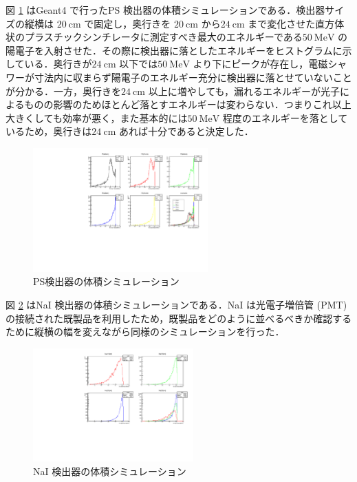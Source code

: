 図 \ref{PS_sim} はGeant4 で行ったPS 検出器の体積シミュレーションである．検出器サイズの縦横は $20~\mathrm{cm}$ で固定し，奥行きを $20~\mathrm{cm}$ から$24~\mathrm{cm}$ まで変化させた直方体状のプラスチックシンチレータに測定すべき最大のエネルギーである$50~\mathrm{MeV}$ の陽電子を入射させた．その際に検出器に落としたエネルギーをヒストグラムに示している．奥行きが$24~\mathrm{cm}$ 以下では$50~\mathrm{MeV}$ より下にピークが存在し，電磁シャワーが寸法内に収まらず陽電子のエネルギー充分に検出器に落とせていないことが分かる．一方，奥行きを$24~\mathrm{cm}$ 以上に増やしても，漏れるエネルギーが光子によるものの影響のためほとんど落とすエネルギーは変わらない．つまりこれ以上大きくしても効率が悪く，また基本的には$50~\mathrm{MeV}$ 程度のエネルギーを落としているため，奥行きは$24~\mathrm{cm}$ あれば十分であると決定した．
\begin{figure}[H]
\centering
\includegraphics[width=0.6\textwidth,angle=-90]{figure/hayakawa/pl_20_24.pdf}
\caption{PS検出器の体積シミュレーション}
\label{PS_sim}
\end{figure}

図 \ref{NaI_sim} はNaI 検出器の体積シミュレーションである．NaI は光電子増倍管 (PMT) の接続された既製品を利用したため，既製品をどのように並べるべきか確認するために縦横の幅を変えながら同様のシミュレーションを行った．

\begin{figure}[H]
\centering
\includegraphics[width=0.55\textwidth,angle=-90]{figure/hayakawa/NaI_10_20.pdf}
\caption{NaI 検出器の体積シミュレーション}
\label{NaI_sim}
\end{figure}

